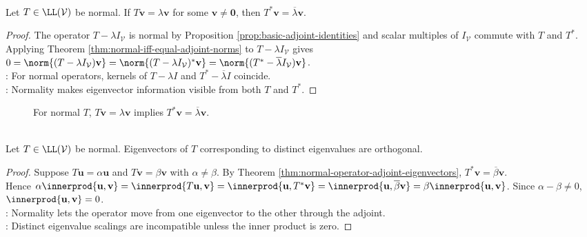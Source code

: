 \begin{theorem} \label{thm:normal-operator-adjoint-eigenvectors} \\
Let $T\in\LL(\mathcal{V})$ be normal. If $T\mathbf{v}=\lambda\mathbf{v}$ for some $\mathbf{v}\neq\mathbf{0}$, then $T^*\mathbf{v}=\overline{\lambda}\mathbf{v}$.
\begin{proof}
The operator $T-\lambda I_{\mathcal{V}}$ is normal by Proposition \ref{prop:basic-adjoint-identities} and scalar multiples of $I_{\mathcal{V}}$ commute with $T$ and $T^*$. Applying Theorem \ref{thm:normal-iff-equal-adjoint-norms} to $T-\lambda I_{\mathcal{V}}$ gives $0=\norm{(T-\lambda I_{\mathcal{V}})\mathbf{v}} =\norm{(T-\lambda I_{\mathcal{V}})^*\mathbf{v}} =\norm{(T^*-\overline{\lambda}I_{\mathcal{V}})\mathbf{v}}$.\\
: For normal operators, kernels of $T-\lambda I$ and $T^*-\overline{\lambda}I$ coincide.\\
: Normality makes eigenvector information visible from both $T$ and $T^*$.
\end{proof}
\end{theorem}

\begin{figure}[H]
  \centering
  
  \caption{For normal $T$, $T\mathbf{v}=\lambda\mathbf{v}$ implies $T^*\mathbf{v}=\overline{\lambda}\mathbf{v}$.}
  \label{fig:normal-operator-eigenvectors}
\end{figure}

\begin{theorem} \label{thm:normal-eigenvectors-distinct-eigenvalues-orthogonal} \\
Let $T\in\LL(\mathcal{V})$ be normal. Eigenvectors of $T$ corresponding to distinct eigenvalues are orthogonal.
\begin{proof}
Suppose $T\mathbf{u}=\alpha\mathbf{u}$ and $T\mathbf{v}=\beta\mathbf{v}$ with $\alpha\neq\beta$. By Theorem \ref{thm:normal-operator-adjoint-eigenvectors}, $T^*\mathbf{v}=\overline{\beta}\mathbf{v}$.\\
Hence $\alpha\innerprod{\mathbf{u},\mathbf{v}} =\innerprod{T\mathbf{u},\mathbf{v}} =\innerprod{\mathbf{u},T^*\mathbf{v}} =\innerprod{\mathbf{u},\overline{\beta}\mathbf{v}} =\beta\innerprod{\mathbf{u},\mathbf{v}}$. Since $\alpha-\beta\neq0$, $\innerprod{\mathbf{u},\mathbf{v}}=0$.\\
: Normality lets the operator move from one eigenvector to the other through the adjoint.\\
: Distinct eigenvalue scalings are incompatible unless the inner product is zero.
\end{proof}
\end{theorem}

